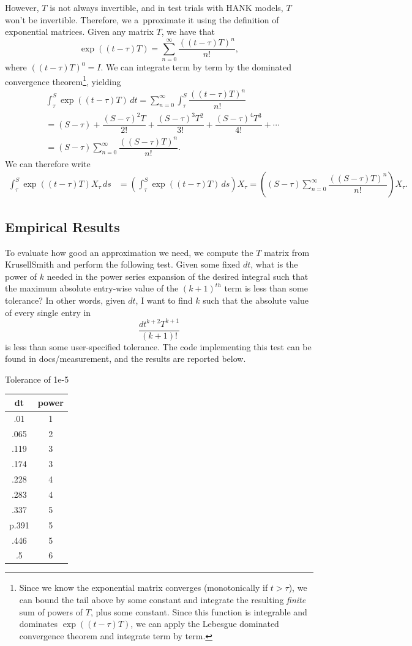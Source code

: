 \documentclass[12 pt, oneside]{article}
\theoremstyle{definition}
\theoremstyle{definition}
\theoremstyle{definition}
\begin{document}
However, $T$ is not always invertible, and in test trials with HANK models, $T$ won't be invertible. Therefore, we a\
pproximate it using the definition of exponential matrices. Given any matrix $T$, we have that
\[ \exp((t-\tau) T) = \sum_{n = 0}^\infty \dfrac{((t-\tau)T)^n}{n!}, \]
where $((t-\tau)T)^0 = I$. We can integrate term by term by the dominated convergence theorem\footnote{Since we know the exponential matrix converges (monotonically if $t>\tau$), we can bound the tail above by some constant and integrate the resulting \textit{finite} sum of powers of $T$, plus some constant. Since this function is integrable and dominates $\exp((t-\tau)T)$, we can apply the Lebesgue dominated convergence theorem and integrate term by term.}, yielding
\begin{align*}
& \int_{\tau}^S \exp((t-\tau)T)\, dt = \sum_{ n = 0}^\infty \int_\tau^S \dfrac{((t-\tau)T)^n}{n!}\\
& = (S-\tau) +\dfrac{(S-\tau)^2 T}{2!} + \dfrac{(S-\tau)^3T^2}{3!} + \dfrac{(S-\tau)^4T^3}{4!} + \cdots\\
& = (S-\tau)\sum_{n = 0}^\infty \dfrac{((S-\tau)T)^n}{n!}.
\end{align*}
We can therefore write
\begin{align*}
\int_\tau^S \exp((t-\tau)T) X_\tau\, ds & = \left(\int_\tau^S \exp((t-\tau)T)\, ds\right) X_\tau= \left((S-\tau)\sum_{n = 0}^\infty \dfrac{((S-\tau)T)^n}{n!}\right)X_\tau.
\end{align*}

\subsection{Empirical Results}
To evaluate how good an approximation we need, we compute the $T$ matrix from KrusellSmith and perform the following test. Given some fixed $dt$, what is the power of $k$ needed in the power series expansion of the desired integral such that the maximum absolute entry-wise value of the $(k+1)^{th}$ term is less than some tolerance? In other words, given $dt$, I want to find $k$ such that the absolute value of every single entry in
\[ \dfrac{dt^{k+2} T^{k+1}}{(k+1)!} \]
is less than some user-specified tolerance. The code implementing this test can be found in docs/measurement, and the results are reported below.

Tolerance of 1e-5
\begin{center}
  \begin{tabular}{|c|c|}
\hline
    dt & power\\
\hline
.01   & 1\\
.065   &2\\
.119   &3\\
.174   &3\\
.228   &4\\
.283   &4\\
.337   &5\\
p.391   &5\\
.446   &5\\
.5&     6\\
\hline
  \end{tabular}
\end{center}
\end{document}
